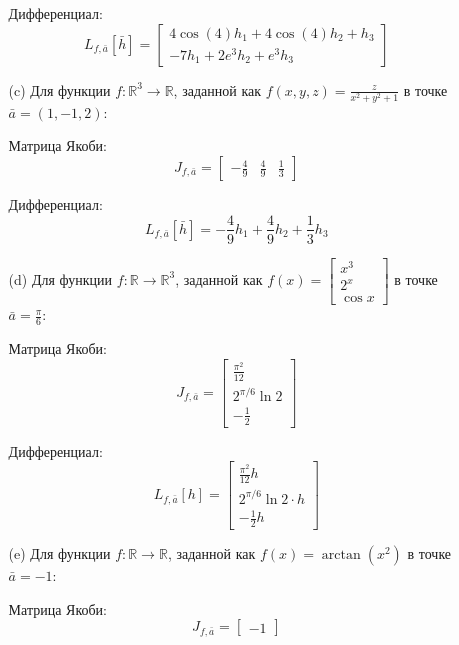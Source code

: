 \documentclass[a4paper]{article}
\begin{document}
\begin{enumerate}
\begin{enumerate}
        Дифференциал:
        \[
        L_{f, \bar{a}}[\bar{h}] = \begin{bmatrix} 4\cos(4)h_1 + 4\cos(4)h_2 + h_3 \\ -7h_1 + 2e^3h_2 + e^3h_3 \end{bmatrix}
        \]

        \item[(c)] Для функции \( f: \mathbb{R}^3 \rightarrow \mathbb{R} \), заданной как \( f(x, y, z) = \frac{z}{x^2 + y^2 + 1} \) в точке \( \bar{a} = (1, -1, 2) \):

        Матрица Якоби:
        \[
        J_{f, \bar{a}} = \begin{bmatrix} -\frac{4}{9} & \frac{4}{9} & \frac{1}{3} \end{bmatrix}
        \]

        Дифференциал:
        \[
        L_{f, \bar{a}}[\bar{h}] = -\frac{4}{9}h_1 + \frac{4}{9}h_2 + \frac{1}{3}h_3
        \]

        \item[(d)] Для функции \( f: \mathbb{R} \rightarrow \mathbb{R}^3 \), заданной как \( f(x) = \begin{bmatrix} x^3 \\ 2^x \\ \cos x \end{bmatrix} \) в точке \( \bar{a} = \frac{\pi}{6} \):

        Матрица Якоби:
        \[
        J_{f, \bar{a}} = \begin{bmatrix}
        \frac{\pi^2}{12} \\
        2^{\pi/6}\ln 2 \\
        -\frac{1}{2}
        \end{bmatrix}
        \]

        Дифференциал:
        \[
        L_{f, \bar{a}}[h] = \begin{bmatrix} \frac{\pi^2}{12}h \\ 2^{\pi/6}\ln 2 \cdot h \\ -\frac{1}{2}h \end{bmatrix}
        \]

        \item[(e)] Для функции \( f: \mathbb{R} \rightarrow \mathbb{R} \), заданной как \( f(x) = \arctan(x^2) \) в точке \( \bar{a} = -1 \):

        Матрица Якоби:
        \[
        J_{f, \bar{a}} = \begin{bmatrix} -1 \end{bmatrix}
        \]


\end{enumerate}
\end{enumerate}
\end{document}
